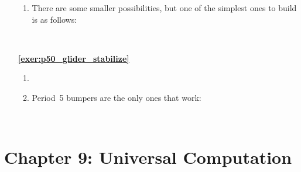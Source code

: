 \begin{multicols}{2}
\begin{itemize}[leftmargin=0em]
\begin{enumerate}[leftmargin=1.5em,label=\bf\color{ocre}(\alph*)]
			\item There are some smaller possibilities, but one of the simplest ones to build is as follows:
			\begin{center}
				\\
			\end{center}
		\end{enumerate}
		
		
		\item[\bf\color{ocre}\sffamily\ref{exer:p50_glider_stabilize}] \begin{enumerate}[leftmargin=1.5em,label=\bf\color{ocre}(\alph*)]
			\item {} \\
			
			\item Period~5 bumpers are the only ones that work:
			\begin{center}
				\\
			\end{center}
		\end{enumerate}
	\end{itemize}
\end{multicols}




\hypertarget{solutions_universal_computation}{}\label{solutions_universal_computation}
\section*{Chapter 9: Universal Computation}
\renewcommand{\chapterfolder}{universal_computation/}

